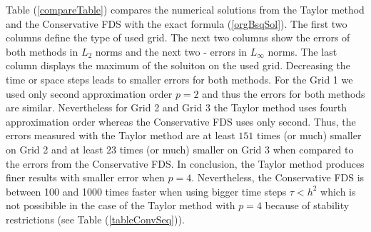 \documentclass[%
 aip,
cp,  
 amsmath,amssymb,
 reprint,
]{iopconfser}
\newcommand{\rf}[1]{(\ref{#1})}
\begin{document}
Table \rf{compareTable} compares the numerical solutions from the Taylor method and the Conservative FDS with the exact formula \rf{orgBsqSol}. The first two columns define the type of used grid. The next two columns show the errors of both methods in $L_2$ norms and the next two - errors in $L_\infty$ norms. The last column displays the maximum of the soluiton on the used grid. Decreasing the time or space steps leads to smaller errors
for both methods. For the Grid 1 we used only second approximation order $p=2$ and thus the errors for both methods are similar. Nevertheless for Grid 2 and Grid 3 the Taylor method uses fourth approximation order whereas 
the Conservative FDS uses only second. Thus, the errors measured with the Taylor method are at least $151$ times (or much) smaller on Grid 2 and at least $23$ times (or much) smaller on Grid 3 when compared to the errors from the Conservative FDS. In conclusion, the Taylor method produces finer results with smaller error when $p=4$. Nevertheless, the Conservative FDS is between 100 and 1000 times faster when using bigger time steps $\tau < h^2$ which is not possibible in the case of the Taylor method with $p=4$ because of stability restrictions (see Table \rf{tableConvSeq}).

\iffalse
\end{document}
